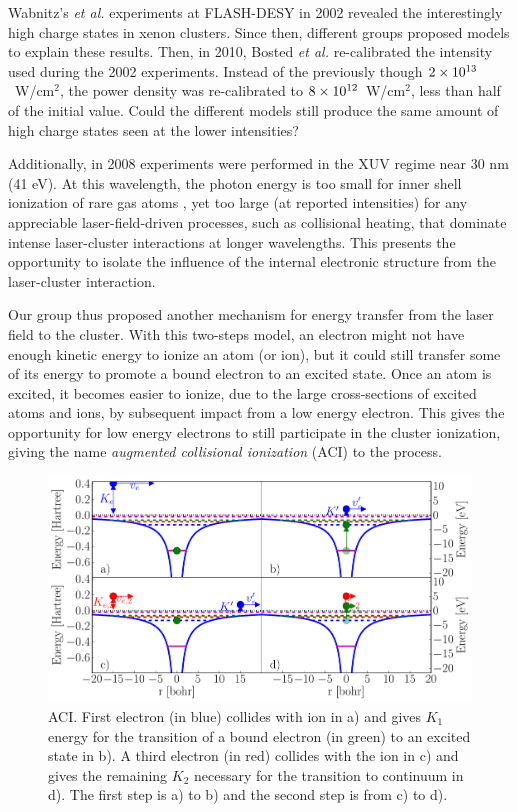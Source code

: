 Wabnitz's \textit{et al.} experiments at FLASH-DESY in 2002 revealed the
interestingly high charge states in xenon clusters. Since then, different groups
proposed models to explain these results. Then, in 2010, Bosted \textit{et al.}
re-calibrated the intensity used during the 2002 experiments.
Instead of the previously though $\ten{2}{13}$~W/cm$^2$, the power density was
re-calibrated to $\ten{8}{12}$~W/cm$^2$, less than half of the initial value.
Could the different models still produce the same amount of high charge states
seen at the lower intensities?

Additionally, in 2008 experiments \cite{Bostedt2008,Murphy2008b} were performed
in the XUV regime near 30 nm (41 eV). At this wavelength, the photon energy is
too small for inner shell ionization of rare gas atoms , yet too large
(at reported intensities) for any appreciable laser-field-driven processes, such
as collisional heating, that dominate intense laser-cluster interactions at
longer wavelengths. This presents the opportunity to isolate the influence of
the internal electronic structure from the laser-cluster interaction.

Our group thus proposed another mechanism for energy transfer from the laser field
to the cluster. With this two-steps model, an electron might not have enough
kinetic energy to ionize an atom (or ion), but it could still transfer some of
its energy to promote a bound electron to an excited state. Once an atom is
excited, it becomes easier to ionize, due to the large cross-sections of excited
atoms and ions, by subsequent impact from a low energy electron. This gives the
opportunity for low energy electrons to still participate in the cluster
ionization, giving the name \textit{augmented collisional ionization} (ACI) to
the process.

\begin{figure}
 \centering
 \includegraphics[width=\figurewidth]{figures/ionization_aci}
 \caption{ACI. First electron (in blue) collides with ion in a) and gives
          $K_1$ energy for the transition of a bound electron (in green) to an
          excited state in b).
          A third electron (in red) collides with the ion in c) and
          gives the remaining $K_2$ necessary for the transition to continuum
          in d). The first step is a) to b) and the second step is from c) to d).}
 \label{fig:ionization:aci}
\end{figure}


